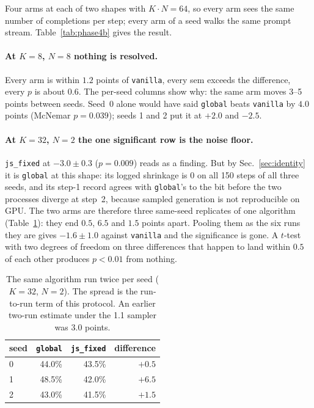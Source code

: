 \documentclass{article}
\newcommand{\arm}[1]{\texttt{#1}}
\begin{document}
Four arms at each of two shapes with $K\cdot N=64$, so every arm sees the
same number of completions per step; every arm of a seed walks the same
prompt stream. Table~\ref{tab:phase4b} gives the result.

\paragraph{At $K=8$, $N=8$ nothing is resolved.} Every arm is within $1.2$
points of \arm{vanilla}, every sem exceeds the difference, every $p$ is
about $0.6$. The per-seed columns show why: the same arm moves 3--5 points
between seeds. Seed~0 alone would have said \arm{global} beats
\arm{vanilla} by $4.0$ points (McNemar $p=0.039$); seeds 1 and 2 put it at
$+2.0$ and $-2.5$.

\paragraph{At $K=32$, $N=2$ the one significant row is the noise floor.}
\label{sec:floor}
\arm{js\_fixed} at $-3.0\pm0.3$ ($p=0.009$) reads as a finding. But by
Sec.~\ref{sec:identity} it is \arm{global} at this shape: its logged
shrinkage is $0$ on all 150 steps of all three seeds, and its step-1 record
agrees with \arm{global}'s to the bit before the two processes diverge at
step~2, because sampled generation is not reproducible on GPU. The two arms
are therefore three same-seed replicates of one algorithm
(Table~\ref{tab:twins}): they end $0.5$, $6.5$ and $1.5$ points apart.
Pooling them as the six runs they are gives $-1.6\pm1.0$ against
\arm{vanilla} and the significance is gone. A $t$-test with two degrees of
freedom on three differences that happen to land within $0.5$ of each
other produces $p<0.01$ from nothing.

\begin{table}[t]\centering\small
\begin{tabular}{lrrr}
\toprule
seed & \arm{global} & \arm{js\_fixed} & difference \\
\midrule
0 & 44.0\% & 43.5\% & $+0.5$ \\
1 & 48.5\% & 42.0\% & $+6.5$ \\
2 & 43.0\% & 41.5\% & $+1.5$ \\
\bottomrule
\end{tabular}
\caption{The same algorithm run twice per seed ($K=32$, $N=2$). The spread
is the run-to-run term of this protocol. An earlier two-run estimate under
the 1.1 sampler was $3.0$ points.}
\label{tab:twins}
\end{table}
\end{document}
